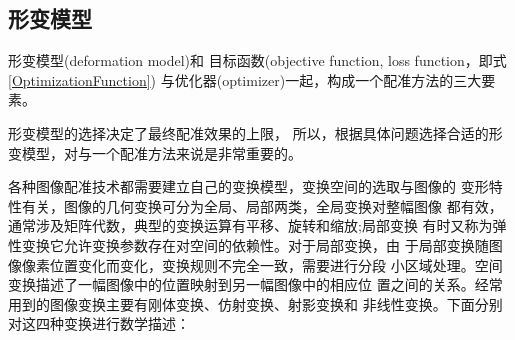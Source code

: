 \subsection{形变模型}\label{SectionTransformation}
形变模型(deformation model)和
目标函数(objective function, loss function，即式\ref{OptimizationFunction})
与优化器(optimizer)一起，构成一个配准方法的三大要素。

形变模型的选择决定了最终配准效果的上限，
所以，根据具体问题选择合适的形变模型，对与一个配准方法来说是非常重要的。

各种图像配准技术都需要建立自己的变换模型，变换空间的选取与图像的
变形特性有关，图像的几何变换可分为全局、局部两类，全局变换对整幅图像
都有效，通常涉及矩阵代数，典型的变换运算有平移、旋转和缩放;局部变换
有时又称为弹性变换它允许变换参数存在对空间的依赖性。对于局部变换，由
于局部变换随图像像素位置变化而变化，变换规则不完全一致，需要进行分段
小区域处理。空间变换描述了一幅图像中的位置映射到另一幅图像中的相应位
置之间的关系。经常用到的图像变换主要有刚体变换、仿射变换、射影变换和
非线性变换。下面分别对这四种变换进行数学描述：

